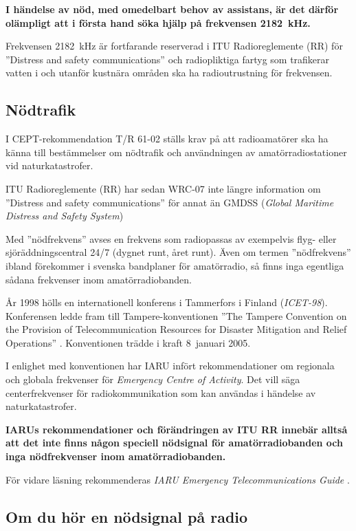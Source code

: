 \textbf{I händelse av nöd, med omedelbart behov av assistans, är det därför
	olämpligt att i första hand söka hjälp på frekvensen 2182~kHz.}

Frekvensen 2182~kHz är fortfarande reserverad i ITU Radioreglemente (RR)
\cite{ITU-RR} för ''Distress and safety communications'' och radiopliktiga
fartyg som trafikerar vatten i och utanför kustnära områden ska ha
radioutrustning för frekvensen.

\subsection{Nödtrafik}
\label{nödtrafik}

I CEPT-rekommendation T/R 61-02 \cite{TR6102} ställs krav på att radioamatörer
ska ha känna till bestämmelser om nödtrafik och användningen av
amatörradiostationer vid naturkatastrofer.

ITU Radioreglemente (RR) \cite{ITU-RR} har sedan WRC-07 inte längre information
om ''Distress and safety communications'' för annat än
GMDSS (\emph{Global Maritime Distress and Safety System})

Med ''nödfrekvens'' avses en frekvens som radiopassas av exempelvis flyg- eller
sjöräddningscentral 24/7 (dygnet runt, året runt).
Även om termen ''nödfrekvens'' ibland förekommer i svenska bandplaner för
amatörradio, så finns inga egentliga sådana frekvenser inom amatörradiobanden.

År 1998 hölls en internationell konferens i Tammerfors i Finland
(\emph{ICET-98}).
Konferensen ledde fram till Tampere-konventionen ''The Tampere Convention on
the Provision of Telecommunication Resources for Disaster Mitigation and Relief
Operations'' \cite{TampereConvention}.
Konventionen trädde i kraft 8~januari 2005.

I enlighet med konventionen har IARU infört rekommendationer om regionala och
globala frekvenser för \emph{Emergency Centre of Activity}.
Det vill säga centerfrekvenser för radiokommunikation som kan användas i
händelse av naturkatastrofer.

\textbf{IARUs rekommendationer och förändringen av ITU RR innebär alltså att
  det inte finns någon speciell nödsignal för amatörradiobanden och inga
  nödfrekvenser inom amatörradiobanden.}

För vidare läsning rekommenderas
\emph{IARU Emergency Telecommunications Guide} \cite{IARU-ETG}.

\subsection{Om du hör en nödsignal på radio}

